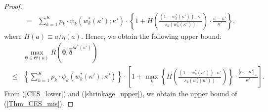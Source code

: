 \documentclass[10pt,a4paper]{amsart}
\begin{document}
\begin{proof}
\begin{eqnarray}
&=& \sum_{k=1}^K p_k \cdot \psi_k\left( w_k^{\ast}(\kappa') ;\kappa' \right) \cdot \left\{ 1 + H \left( \frac{(1-w_k^{\ast}(\kappa')) \cdot \kappa' }{s_k \left( w_k^{\ast}(\kappa') \right)} \right) \cdot \frac{\kappa - \kappa'}{\kappa'} \right\}, \nonumber
\end{eqnarray}
where $H(a) \equiv a/\eta(a)$. Hence, we obtain the following upper bound:
\begin{eqnarray}
& & \max_{\bm{\theta} \in \Theta(\kappa)} R(\bm{\theta},\hat{\bm{\delta}}^{\bm{w}^*(\kappa')}) \nonumber \\
&\leq & \left\{ \sum_{k=1}^K p_k \cdot \psi_k\left( w_k^{\ast}(\kappa') ;\kappa' \right) \right\} \cdot \left[ 1 + \max_{k} \left\{ H \left( \frac{(1-w_k^{\ast}(\kappa')) \cdot \kappa' }{s_k \left( w_k^{\ast}(\kappa') \right)} \right) \right\} \cdot \frac{|\kappa - \kappa'|_{+}}{\kappa'} \right]. \label{shrinkage_upper}
\end{eqnarray}
From (\ref{CES_lower}) and (\ref{shrinkage_upper}), we obtain the upper bound of (\ref{Thm_CES_mis}).
\end{proof}\vspace{0.1in}
\end{document}
